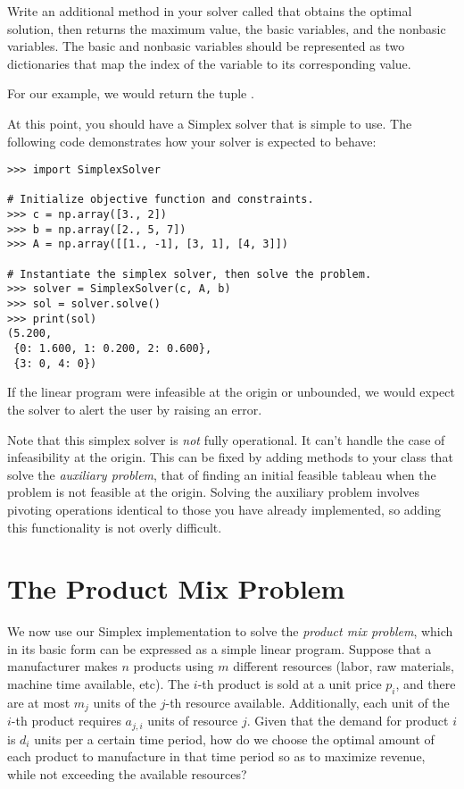 \begin{problem}
Write an additional method in your solver called  that obtains the optimal solution, then returns the maximum value, the basic variables, and the nonbasic variables.
The basic and nonbasic variables should be represented as two dictionaries that map the index of the variable to its corresponding value.

For our example, we would return the tuple .
\end{problem}

At this point, you should have a Simplex solver that is simple to use. The following code demonstrates how your solver is
expected to behave:

\begin{lstlisting}
>>> import SimplexSolver

# Initialize objective function and constraints.
>>> c = np.array([3., 2])
>>> b = np.array([2., 5, 7])
>>> A = np.array([[1., -1], [3, 1], [4, 3]])

# Instantiate the simplex solver, then solve the problem.
>>> solver = SimplexSolver(c, A, b)
>>> sol = solver.solve()
>>> print(sol)
(5.200,
 {0: 1.600, 1: 0.200, 2: 0.600},
 {3: 0, 4: 0})
\end{lstlisting}

If the linear program were infeasible at the origin or unbounded, we would expect the solver to alert the user by raising an error.

Note that this simplex solver is \emph{not} fully operational.
It can't handle the case of infeasibility at the origin.
This can be fixed by adding methods to your class that solve the \emph{auxiliary problem}, that of finding an initial feasible tableau when the problem is not feasible at the origin.
Solving the auxiliary problem involves pivoting operations identical to those you have already implemented, so adding this functionality
is not overly difficult.

\section*{The Product Mix Problem}
We now use our Simplex implementation to solve the \emph{product mix problem}, which in its basic form can be expressed as a simple linear program.
Suppose that a manufacturer makes $n$ products using $m$ different resources (labor, raw materials, machine time available, etc).
The $i$-th product is sold at a unit price $p_i$, and there are at most $m_j$ units
of the $j$-th resource available. Additionally, each unit of the $i$-th product requires $a_{j,i}$ units of resource $j$.
Given that the demand for product $i$ is $d_i$ units per a certain time period, how do we choose the optimal amount
of each product to manufacture in that time period so as to maximize revenue, while not exceeding the available resources?


